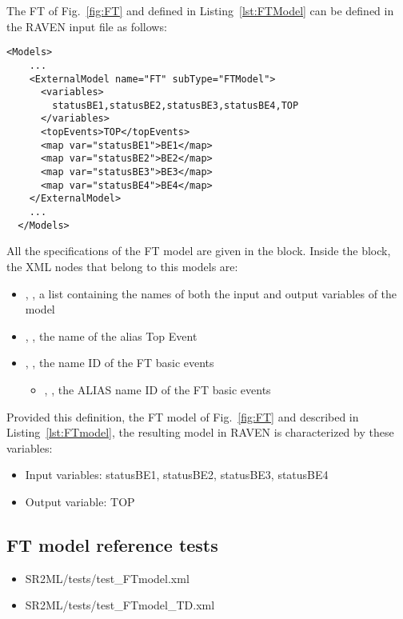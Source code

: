 The FT of Fig.~\ref{fig:FT} and defined in Listing~\ref{lst:FTModel} can be defined in the RAVEN input file as follows:

\begin{lstlisting}[style=XML,morekeywords={anAttribute},caption=FT model input example., label=lst:FT_InputExample]
  <Models>
    ...
    <ExternalModel name="FT" subType="FTModel">
      <variables>
        statusBE1,statusBE2,statusBE3,statusBE4,TOP
      </variables>
      <topEvents>TOP</topEvents>
      <map var="statusBE1">BE1</map>
      <map var="statusBE2">BE2</map>
      <map var="statusBE3">BE3</map>
      <map var="statusBE4">BE4</map>
    </ExternalModel>
    ...
  </Models>
\end{lstlisting}

All the specifications of the FT model are given in the
 block.
Inside the  block, the XML
nodes that belong to this models are:
\begin{itemize}
  \item  {}, , a list containing the names of both the input and output variables of the model
  \item  {}, , the name of the alias Top Event
  \item  {}, , the name ID of the FT basic events
	  \begin{itemize}
	    \item {}, , the ALIAS name ID of the FT basic events
	  \end{itemize}
\end{itemize}

Provided this definition, the FT model of Fig.~\ref{fig:FT} and described in Listing~\ref{lst:FTmodel},
the resulting model in RAVEN is characterized by these variables:
\begin{itemize}
	\item Input variables: statusBE1, statusBE2, statusBE3, statusBE4
	\item Output variable: TOP
\end{itemize}

\subsection{FT model reference tests}
\begin{itemize}
	\item SR2ML/tests/test\_FTmodel.xml
	\item SR2ML/tests/test\_FTmodel\_TD.xml
\end{itemize}
